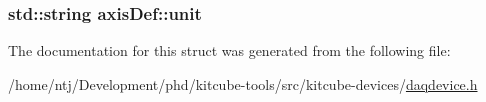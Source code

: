 \hypertarget{structaxisDef_a5400e43536c69ae82dac0645699415fc}{
\subsubsection[{unit}]{\setlength{\rightskip}{0pt plus 5cm}std\-::string axis\-Def\-::unit}}\label{structaxisDef_a5400e43536c69ae82dac0645699415fc}


The documentation for this struct was generated from the following file\-:\begin{DoxyCompactItemize}
\item 
/home/ntj/\-Development/phd/kitcube-\/tools/src/kitcube-\/devices/\hyperlink{daqdevice_8h}{daqdevice.\-h}\end{DoxyCompactItemize}
